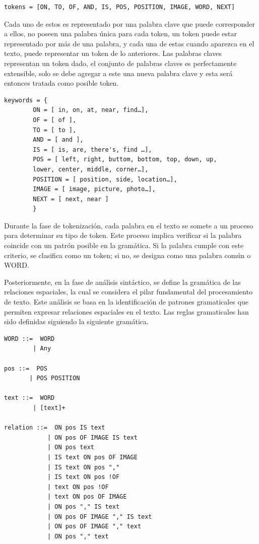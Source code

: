 \begin{verbatim}
tokens = [ON, TO, OF, AND, IS, POS, POSITION, IMAGE, WORD, NEXT]
\end{verbatim}

Cada uno de estos es representado por una palabra clave que puede corresponder a ellos, no poseen una palabra única para cada token, un token puede estar representado por más de una palabra, y cada una de estas cuando aparezca en el texto, puede representar un token de lo anteriores. Las palabras claves representan un token dado, el conjunto de palabras claves es perfectamente extensible, solo se debe agregar a este una nueva palabra clave y esta ser\'a entonces tratada como posible token.

\begin{verbatim}
keywords = {
        ON = [ in, on, at, near, find…],
        OF = [ of ],
        TO = [ to ],
        AND = [ and ],
        IS = [ is, are, there's, find …],
        POS = [ left, right, buttom, bottom, top, down, up, 
        lower, center, middle, corner…],
        POSITION = [ position, side, location…],
        IMAGE = [ image, picture, photo…],
        NEXT = [ next, near ]
        }
\end{verbatim}

Durante la fase de tokenización, cada palabra en el texto se somete a un proceso para determinar su tipo de token. Este proceso implica verificar si la palabra coincide con un patrón posible en la gramática. Si la palabra cumple con este criterio, se clasifica como un token; si no, se designa como una palabra común o WORD.

Posteriormente, en la fase de análisis sintáctico, se define la gramática de las relaciones espaciales, la cual se considera el pilar fundamental del procesamiento de texto. Este análisis se basa en la identificación de patrones gramaticales que permiten expresar relaciones espaciales en el texto. Las reglas gramaticales han sido definidas siguiendo la siguiente gram\'atica.
 
\begin{verbatim}
WORD ::=  WORD
        | Any
    
pos ::=  POS
       | POS POSITION 

text ::=  WORD
        | [text]+
        
relation ::=  ON pos IS text
            | ON pos OF IMAGE IS text
            | ON pos text
            | IS text ON pos OF IMAGE
            | IS text ON pos ","
            | IS text ON pos !OF
            | text ON pos !OF
            | text ON pos OF IMAGE
            | ON pos "," IS text
            | ON pos OF IMAGE "," IS text
            | ON pos OF IMAGE "," text
            | ON pos "," text
\end{verbatim}

